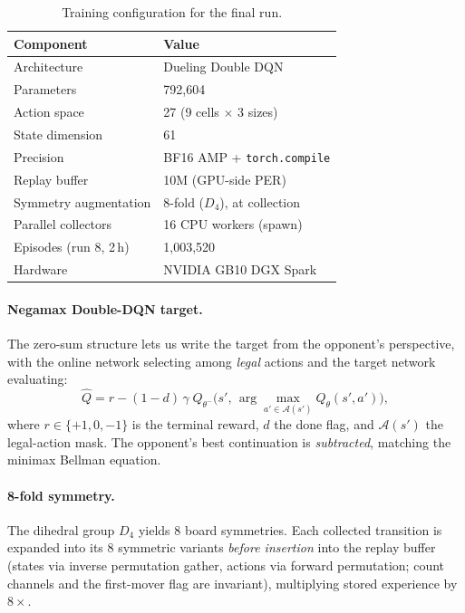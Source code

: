 \documentclass[10pt,twocolumn]{article}
\begin{document}
\begin{table}[h]
\centering\small
\setlength{\tabcolsep}{4pt}
\begin{tabular}{ll}
\toprule
\textbf{Component} & \textbf{Value} \\
\midrule
Architecture & Dueling Double DQN \\
Parameters & 792,604 \\
Action space & 27 (9 cells $\times$ 3 sizes) \\
State dimension & 61 \\
Precision & BF16 AMP + \texttt{torch.compile} \\
Replay buffer & 10M (GPU-side PER) \\
Symmetry augmentation & 8-fold ($D_4$), at collection \\
Parallel collectors & 16 CPU workers (spawn) \\
Episodes (run 8, 2\,h) & 1,003,520 \\
Hardware & NVIDIA GB10 DGX Spark \\
\bottomrule
\end{tabular}
\caption{Training configuration for the final run.}
\label{tab:config}
\end{table}

\paragraph{Negamax Double-DQN target.} The zero-sum structure lets us write
the target from the opponent's perspective, with the online network selecting
among \emph{legal} actions and the target network evaluating:
\begin{equation*}
\hat{Q} = r - (1-d)\,\gamma\;
Q_{\theta^-}\!\bigl(s',\, \arg\max_{a' \in \mathcal{A}(s')} Q_{\theta}(s',a')\bigr),
\end{equation*}
where $r \in \{+1,0,-1\}$ is the terminal reward, $d$ the done flag, and
$\mathcal{A}(s')$ the legal-action mask. The opponent's best continuation is
\emph{subtracted}, matching the minimax Bellman equation.

\paragraph{8-fold symmetry.} The dihedral group $D_4$ yields 8 board
symmetries. Each collected transition is expanded into its 8 symmetric
variants \emph{before insertion} into the replay buffer (states via inverse
permutation gather, actions via forward permutation; count channels and the
first-mover flag are invariant), multiplying stored experience by $8\times$.
\end{document}
